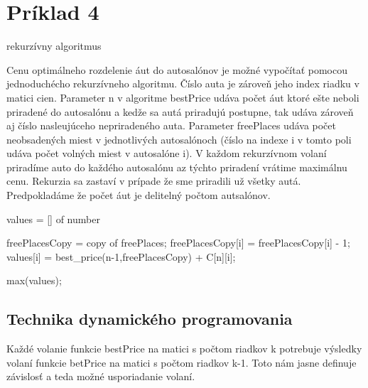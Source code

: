 \documentclass[paper=a4, fontsize=11pt]{scrartcl} %
\numberwithin{equation}{section} %
\numberwithin{figure}{section} %
\numberwithin{table}{section} %
\begin{document}
\pagebreak


\section*{Príklad 4}

rekurzívny algoritmus

Cenu optimálneho rozdelenie áut do autosalónov je možné vypočítať pomocou jednoduchécho rekurzívneho algoritmu.
Číslo auta je zároveň jeho index riadku v matici cien.
Parameter n v algoritme bestPrice udáva počet áut ktoré ešte neboli priradené do autosalónu a kedže sa autá priradujú postupne, tak udáva zároveň aj číslo nasleujúceho nepriradeného auta.
Parameter freePlaces udáva počet neobsadených miest v jednotlivých autosalónoch (číslo na indexe i v tomto poli udáva počet volných miest v autosalóne i).
V každom rekurzívnom volaní priradíme auto do každého autosalónu az týchto priradení vrátime maximálnu cenu.
Rekurzia sa zastaví v prípade že sme priradili už všetky autá.
Predpokladáme že počet áut je delitelný počtom autsalónov.

\begin{algorithmic}[1]
        \State {}
    \EndIf

    \State values = [] of number

            \State freePlacesCopy = copy of freePlaces;			
            \State	freePlacesCopy[i] = freePlacesCopy[i] - 1;			
            \State values[i] = best\_price(n-1,freePlacesCopy) + C[n][i];
        \EndIf
    \EndFor

    \State \Return max(values);
\EndFunction
\end{algorithmic}

\subsection*{Technika dynamického programovania}

Každé volanie funkcie bestPrice na matici s počtom riadkov k potrebuje  výsledky volaní funkcie betPrice na matici s počtom riadkov k-1. Toto nám jasne definuje závislosť  a teda možné usporiadanie volaní.
\end{document}
